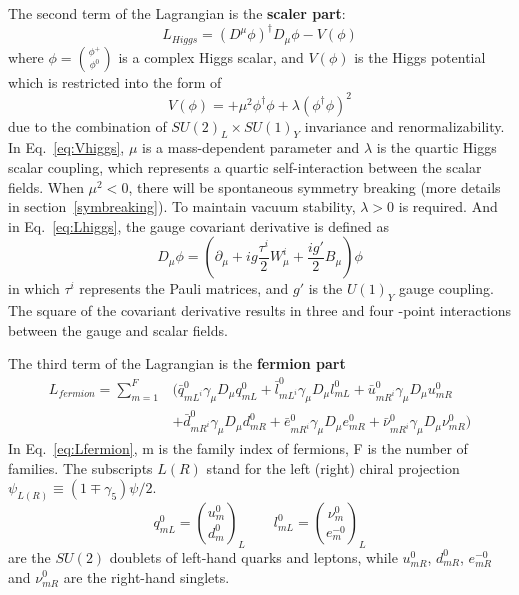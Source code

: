 The second term of the Lagrangian is the \textbf{scaler part}:
\begin{equation} \label{eq:Lhiggs}
	{L}_{Higgs} = \left(D^{\mu}\phi\right)^{\dagger}D_{\mu}\phi - V(\phi)
\end{equation}
where $\phi = \binom{\phi^{+}}{\phi^{0}}$ is a complex Higgs scalar,
and $V(\phi)$ is the Higgs potential which is restricted into the form of 
\begin{equation} \label{eq:Vhiggs}
	V(\phi) = +\mu^{2}\phi^{\dagger}\phi + \lambda\left(\phi^{\dagger}\phi\right)^{2}
\end{equation}
due to the combination of $SU(2)_{L} \times SU(1)_{Y}$ invariance and renormalizability.
In Eq.~\ref{eq:Vhiggs}, $\mu$ is a mass-dependent parameter and $\lambda$ is the quartic Higgs scalar coupling, 
which represents a quartic self-interaction between the scalar fields.
When $\mu^{2} < 0$, there will be spontaneous symmetry breaking (more details in section~\ref{symbreaking}).
To maintain vacuum stability, $\lambda > 0$ is required.
And in Eq.~\ref{eq:Lhiggs}, the gauge covariant derivative is defined as
\begin{equation}
	D_{\mu}\phi = \left(\partial_{\mu} +ig\frac{\tau^{i}}{2}W_{\mu}^{i} + \frac{ig'}{2}B_{\mu}\right)\phi
\end{equation}
in which $\tau^{i}$ represents the Pauli matrices, and $g'$ is the $U(1)_{Y}$ gauge coupling.
The square of the covariant derivative results in three and four -point interactions between the gauge and scalar fields.

The third term of the Lagrangian is the \textbf{fermion part}
\begin{equation} \label{eq:Lfermion}
\begin{split}
  	{L}_{fermion} = \sum_{m=1}^{F} & ( \bar{q}_{mL^{i}}^{0}\gamma_{\mu}D_{\mu}q_{mL}^{0} + \bar{l}_{mL^{i}}^{0}\gamma_{\mu}D_{\mu}l_{mL}^{0} + \bar{u}_{mR^{i}}^{0}\gamma_{\mu}D_{\mu}u_{mR}^{0} \\
  	& + \bar{d}_{mR^{i}}^{0}\gamma_{\mu}D_{\mu}d_{mR}^{0} + \bar{e}_{mR^{i}}^{0}\gamma_{\mu}D_{\mu}e_{mR}^{0} + \bar{\nu}_{mR^{i}}^{0}\gamma_{\mu}D_{\mu}\nu_{mR}^{0})
\end{split}
\end{equation} 
In Eq.~\ref{eq:Lfermion}, m is the family index of fermions, F is the number of families.
The subscripts $L (R)$ stand for the left (right) chiral projection $\psi_{L(R)} \equiv \left(1 \mp \gamma_{5} \right) \psi/2$.
\begin{equation}
	q_{mL}^{0} = \binom{u_{m}^{0}}{d_{m}^{0}}_{L}   \qquad    l_{mL}^{0} = \binom{\nu_{m}^{0}}{e_{m}^{-0}}_{L}
\end{equation}
are the $SU(2)$ doublets of left-hand quarks and leptons, while 
$u_{mR}^{0}$, $d_{mR}^{0}$, $e_{mR}^{-0}$ and $\nu_{mR}^{0}$ are the right-hand singlets.

